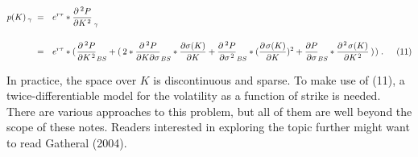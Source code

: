 \documentclass[12pt]{article}
\begin{document}
{\footnotesize
\begin{align*}
p(K)_{\hspace{2pt} \gamma}   \hspace{3pt} &= \hspace{7pt}   e^{r \tau} * \frac{\partial^{\hspace{2pt} 2} P}{\partial K^{\hspace{1pt} 2}}_{\hspace{2pt} \gamma}
\\[12pt]
\hspace{3pt} &= \hspace{7pt}   e^{r \tau} * (\hspace{1pt} \frac{\partial^{\hspace{2pt} 2} P}{\partial K^{\hspace{1pt} 2}}_{BS} + (\hspace{2pt} 2*\frac{\partial^{\hspace{2pt} 2} P}{\partial K \partial \sigma}_{BS} * \frac{\partial \sigma(K)}{\partial K} + \frac{\partial^{\hspace{2pt} 2} P}{\partial \sigma^{\hspace{1pt} 2}}_{BS} * (\frac{\partial \hspace{1pt} \sigma(K)}{\partial K})^{2} + \frac{\partial P}{\partial \sigma}_{\hspace{-1pt} BS} * \frac{\partial^{\hspace{1pt} 2} \hspace{1pt} \sigma(K)}{\partial K^{\hspace{1pt} 2}} \hspace{2pt}) \hspace{1pt}) \hspace{3pt}. \hspace{15pt} (11)
\end{align*}
}

\vspace{-15pt}

\begin{paragraph}
\indent In practice, the space over $K$ is discontinuous and sparse. To make use of (11), a twice-differentiable model for the volatility as a function of strike is needed. There are various approaches to this problem, but all of them are well beyond the scope of these notes. Readers interested in exploring the topic further might want to read Gatheral (2004).
\end{paragraph}

\vspace{15pt}
\end{document}
